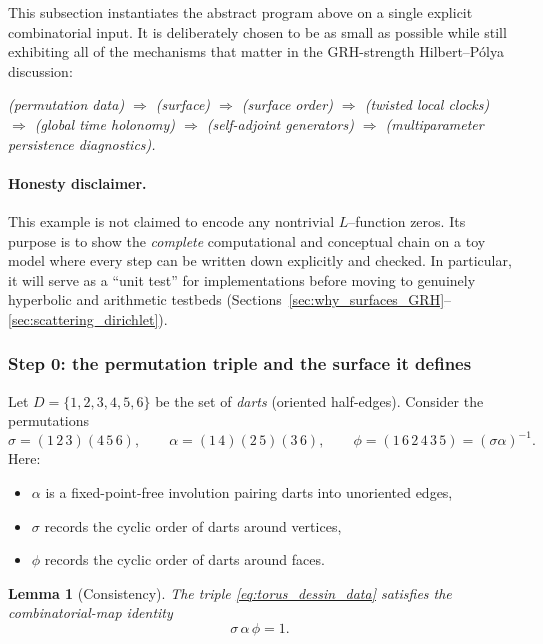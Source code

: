 \documentclass[11pt,oneside]{amsbook}
\numberwithin{equation}{section}
\theoremstyle{plain}
\newtheorem{lemma}[theorem]{Lemma}
\theoremstyle{definition}
\theoremstyle{remark}
\begin{document}
This subsection instantiates the abstract program above on a single explicit combinatorial input.
It is deliberately chosen to be as small as possible while still exhibiting all of the mechanisms that matter in the GRH-strength Hilbert--Pólya discussion:
\begin{center}
\emph{(permutation data) $\Rightarrow$ (surface) $\Rightarrow$ (surface order) $\Rightarrow$ (twisted local clocks) $\Rightarrow$ (global time holonomy) $\Rightarrow$ (self-adjoint generators) $\Rightarrow$ (multiparameter persistence diagnostics).}
\end{center}

\paragraph{Honesty disclaimer.}
This example is not claimed to encode any nontrivial $L$--function zeros.
Its purpose is to show the \emph{complete} computational and conceptual chain on a toy model where every step can be written down explicitly and checked.
In particular, it will serve as a ``unit test'' for implementations before moving to genuinely hyperbolic and arithmetic testbeds (Sections~\ref{sec:why_surfaces_GRH}--\ref{sec:scattering_dirichlet}).

\subsubsection{Step 0: the permutation triple and the surface it defines}

Let $D=\{1,2,3,4,5,6\}$ be the set of \emph{darts} (oriented half-edges).
Consider the permutations
\begin{equation}
\label{eq:torus_dessin_data}
\sigma=(1\,2\,3)(4\,5\,6),\qquad 
\alpha=(1\,4)(2\,5)(3\,6),
\qquad 
\phi=(1\,6\,2\,4\,3\,5)=(\sigma\alpha)^{-1}.
\end{equation}
Here:
\begin{itemize}
\item $\alpha$ is a fixed-point-free involution pairing darts into unoriented edges,
\item $\sigma$ records the cyclic order of darts around vertices,
\item $\phi$ records the cyclic order of darts around faces.
\end{itemize}

\begin{lemma}[Consistency]
\label{lem:torus_saph}
The triple \eqref{eq:torus_dessin_data} satisfies the combinatorial-map identity
\[
\sigma\,\alpha\,\phi=1.
\]
\end{lemma}
\end{document}
